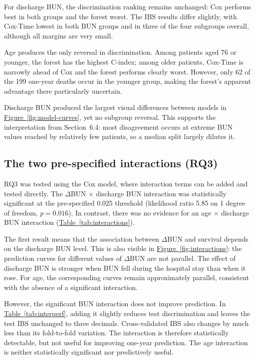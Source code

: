 \documentclass[11pt,a4paper]{article}
\newcommand{\tabref}[1]{\hyperref[#1]{Table~\ref*{#1}}}
\newcommand{\figref}[1]{\hyperref[#1]{Figure~\ref*{#1}}}
\newcommand{\dbun}{$\Delta$BUN}
\begin{document}
For discharge BUN, the discrimination ranking remains unchanged: Cox performs best in both groups and the forest worst. The IBS results differ slightly, with Cox-Time lowest in both BUN groups and in three of the four subgroups overall, although all margins are very small.

Age produces the only reversal in discrimination. Among patients aged 76 or younger, the forest has the highest C-index; among older patients, Cox-Time is narrowly ahead of Cox and the forest performs clearly worst. However, only 62 of the 199 one-year deaths occur in the younger group, making the forest's apparent advantage there particularly uncertain.

Discharge BUN produced the largest visual differences between models in \figref{fig:model-curves}, yet no subgroup reversal. This supports the interpretation from Section~6.4: most disagreement occurs at extreme BUN values reached by relatively few patients, so a median split largely dilutes it.

\subsection{The two pre-specified interactions (RQ3)}

RQ3 was tested using the Cox model, where interaction terms can be added and tested directly. The \dbun{} $\times$ discharge BUN interaction was statistically significant at the pre-specified 0.025 threshold (likelihood ratio 5.85 on 1 degree of freedom, $p = 0.016$). In contrast, there was no evidence for an age $\times$ discharge BUN interaction (\tabref{tab:interactions}).

The first result means that the association between \dbun{} and survival depends on the discharge BUN level. This is also visible in \figref{fig:interactions}: the prediction curves for different values of \dbun{} are not parallel. The effect of discharge BUN is stronger when BUN fell during the hospital stay than when it rose. For age, the corresponding curves remain approximately parallel, consistent with the absence of a significant interaction.

However, the significant BUN interaction does not improve prediction. In \tabref{tab:interperf}, adding it slightly reduces test discrimination and leaves the test IBS unchanged to three decimals. Cross-validated IBS also changes by much less than its fold-to-fold variation. The interaction is therefore statistically detectable, but not useful for improving one-year prediction. The age interaction is neither statistically significant nor predictively useful.
\end{document}
